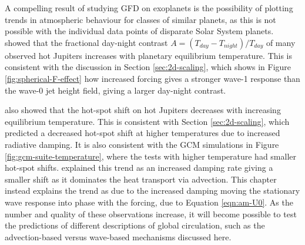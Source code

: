 A compelling result of studying GFD on exoplanets is the possibility of plotting trends in atmospheric behaviour for classes of similar planets, as this is not possible with the individual data points of disparate Solar System planets. \citet{komacek2017daynightII} showed that the fractional day-night contrast $A = (T_{day}-T_{night})/T_{day}$ of many observed hot Jupiters increases with planetary equilibrium temperature. This is consistent with the discussion in Section \ref{sec:2d-scaling}, which shows in Figure \ref{fig:spherical-F-effect} how increased forcing gives a stronger wave-1 response than the wave-0 jet height field, giving a larger day-night contrast.

 \citet{komacek2017daynightII} also showed that the hot-spot shift on hot Jupiters decreases with increasing equilibrium temperature. This is consistent with Section \ref{sec:2d-scaling}, which predicted a decreased hot-spot shift at higher temperatures due to increased radiative damping. It is also consistent with the GCM simulations in Figure \ref{fig:gcm-suite-temperature}, where the tests with higher temperature had smaller hot-spot shifts. \citet{komacek2017daynightII} explained this trend as an increased damping rate giving a smaller shift as it dominates the heat transport via advection. This chapter instead explains the trend as due to the increased damping moving the stationary wave response into phase with the forcing, due to Equation \ref{eqn:am-U0}. As the number and quality of these observations increase, it will become possible to test the predictions of different descriptions of global circulation, such as the advection-based versus wave-based mechanisms discussed here.




